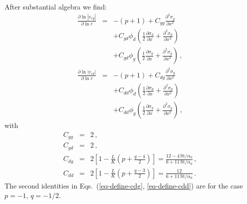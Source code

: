 \documentclass{aa}
\def\comma{\,,}
\def\fullstop{\,.}
\begin{document}
After substantial algebra we find:
\begin{eqnarray}
  \frac{\partial\ln |v_{rg}|}{\partial\ln r} 
  &=&-(p+1) + C_{gg}\frac{\partial^2\sigma_g}{\partial x^2}\nonumber\\
  &&+C_{gd}\phi_d\left(
  \frac{1}{2}\frac{\partial\sigma_d}{\partial x}
  + \frac{\partial^2\sigma_d}{\partial x^2}\right)\nonumber\\
  &&+C_{gd}\phi_g\left(
  \frac{1}{2}\frac{\partial\sigma_g}{\partial x}
  + \frac{\partial^2\sigma_g}{\partial x^2}\right)\comma\label{eq-dbllog-lin-der-vrg-2}\\
  \frac{\partial\ln |v_{rd}|}{\partial\ln r} 
  &=&-(p+1) + C_{dg}\frac{\partial^2\sigma_g}{\partial x^2}\nonumber\\
  &&+C_{dd}\phi_d\left(
  \frac{1}{2}\frac{\partial\sigma_d}{\partial x}
  + \frac{\partial^2\sigma_d}{\partial x^2}\right)\nonumber\\
  &&+C_{dd}\phi_g\left(
  \frac{1}{2}\frac{\partial\sigma_g}{\partial x}
  + \frac{\partial^2\sigma_g}{\partial x^2}\right)\comma\label{eq-dbllog-lin-der-vrd-2}
\end{eqnarray}
with 
\begin{eqnarray}
  C_{gg} &=& 2\comma\label{eq-define-cgg}\\
  C_{gd} &=& 2\comma\label{eq-define-cgd}\\
  C_{dg} &=&2\left[1-\frac{L}{K}\left(p+\frac{q-4}{2}\right)\right] = \frac{12-4\,\mathrm{St}/\alpha_0}{6+11\,\mathrm{St}/\alpha_0}\comma\label{eq-define-cdg}\\
  C_{dd} &=&2\left[1-\frac{L}{K}\left(p+\frac{q-3}{2}\right)\right] = \frac{12}{6+11\,\mathrm{St}/\alpha_0}\label{eq-define-cdd}\fullstop
\end{eqnarray}
The second identities in Eqs.~(\ref{eq-define-cdg}, \ref{eq-define-cdd})
are for the case $p=-1$, $q=-1/2$.
\end{document}
